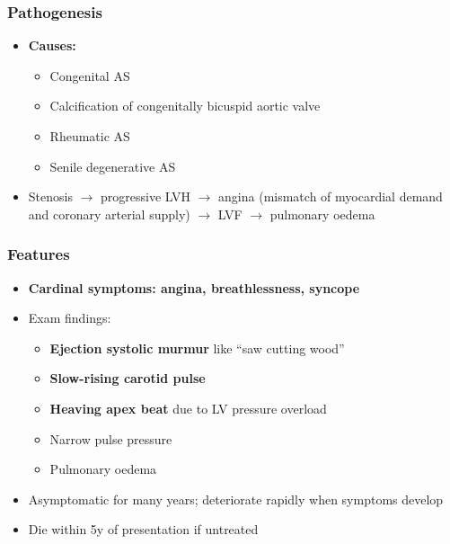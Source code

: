 \documentclass[
  12pt,
]{memoir}
\providecommand{\tightlist}{%
  \setlength{\itemsep}{0pt}\setlength{\parskip}{0pt}}
\begin{document}
\hypertarget{pathogenesis-7}{%
\subsubsection{Pathogenesis}\label{pathogenesis-7}}

\begin{itemize}
\tightlist
\item
  \textbf{Causes:}

  \begin{itemize}
  \tightlist
  \item
    Congenital AS
  \item
    Calcification of congenitally bicuspid aortic valve
  \item
    Rheumatic AS
  \item
    Senile degenerative AS
  \end{itemize}
\item
  Stenosis \(\rightarrow\) progressive LVH \(\rightarrow\) angina
  (mismatch of myocardial demand and coronary arterial supply)
  \(\rightarrow\) LVF \(\rightarrow\) pulmonary oedema
\end{itemize}

\hypertarget{features-9}{%
\subsubsection{Features}\label{features-9}}

\begin{itemize}
\tightlist
\item
  \textbf{Cardinal symptoms: angina, breathlessness, syncope}
\item
  Exam findings:

  \begin{itemize}
  \tightlist
  \item
    \textbf{Ejection systolic murmur} like ``saw cutting wood''
  \item
    \textbf{Slow-rising carotid pulse}
  \item
    \textbf{Heaving apex beat} due to LV pressure overload
  \item
    Narrow pulse pressure
  \item
    Pulmonary oedema
  \end{itemize}
\item
  Asymptomatic for many years; deteriorate rapidly when symptoms develop
\item
  Die within 5y of presentation if untreated
\end{itemize}
\end{document}
